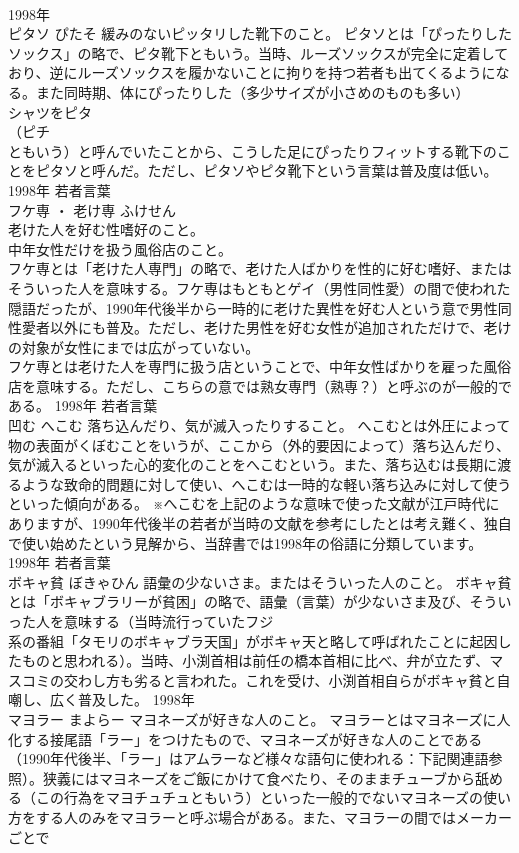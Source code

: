 \documentclass[8pt]{extreport}
\begin{document}
\begin{CJK}{UTF8}{min}
\\	1998年	
\\	ピタソ	ぴたそ	緩みのないピッタリした靴下のこと。	ピタソとは「ぴったりしたソックス」の略で、ピタ靴下ともいう。当時、ルーズソックスが完全に定着しており、逆にルーズソックスを履かないことに拘りを持つ若者も出てくるようになる。また同時期、体にぴったりした（多少サイズが小さめのものも多い）
\\	シャツをピタ
\\	（ピチ
\\	ともいう）と呼んでいたことから、こうした足にぴったりフィットする靴下のことをピタソと呼んだ。ただし、ピタソやピタ靴下という言葉は普及度は低い。	1998年	若者言葉	
\\	フケ専 ・ 老け専	ふけせん	
\\	老けた人を好む性嗜好のこと。 
\\	中年女性だけを扱う風俗店のこと。	
\\	フケ専とは「老けた人専門」の略で、老けた人ばかりを性的に好む嗜好、またはそういった人を意味する。フケ専はもともとゲイ（男性同性愛）の間で使われた隠語だったが、1990年代後半から一時的に老けた異性を好む人という意で男性同性愛者以外にも普及。ただし、老けた男性を好む女性が追加されただけで、老けの対象が女性にまでは広がっていない。 
\\	フケ専とは老けた人を専門に扱う店ということで、中年女性ばかりを雇った風俗店を意味する。ただし、こちらの意では熟女専門（熟専？）と呼ぶのが一般的である。	1998年	若者言葉	
\\	凹む	へこむ	落ち込んだり、気が滅入ったりすること。	へこむとは外圧によって物の表面がくぼむことをいうが、ここから（外的要因によって）落ち込んだり、気が滅入るといった心的変化のことをへこむという。また、落ち込むは長期に渡るような致命的問題に対して使い、へこむは一時的な軽い落ち込みに対して使うといった傾向がある。 ※へこむを上記のような意味で使った文献が江戸時代にありますが、1990年代後半の若者が当時の文献を参考にしたとは考え難く、独自で使い始めたという見解から、当辞書では1998年の俗語に分類しています。	1998年	若者言葉	
\\	ボキャ貧	ぼきゃひん	語彙の少ないさま。またはそういった人のこと。	ボキャ貧とは「ボキャブラリーが貧困」の略で、語彙（言葉）が少ないさま及び、そういった人を意味する（当時流行っていたフジ
\\	系の番組「タモリのボキャブラ天国」がボキャ天と略して呼ばれたことに起因したものと思われる）。当時、小渕首相は前任の橋本首相に比べ、弁が立たず、マスコミの交わし方も劣ると言われた。これを受け、小渕首相自らがボキャ貧と自嘲し、広く普及した。	1998年	
\\	マヨラー	まよらー	マヨネーズが好きな人のこと。	マヨラーとはマヨネーズに人化する接尾語「ラー」をつけたもので、マヨネーズが好きな人のことである（1990年代後半、「ラー」はアムラーなど様々な語句に使われる：下記関連語参照）。狭義にはマヨネーズをご飯にかけて食べたり、そのままチューブから舐める（この行為をマヨチュチュともいう）といった一般的でないマヨネーズの使い方をする人のみをマヨラーと呼ぶ場合がある。また、マヨラーの間ではメーカーごとで

\end{CJK}
\end{document}
